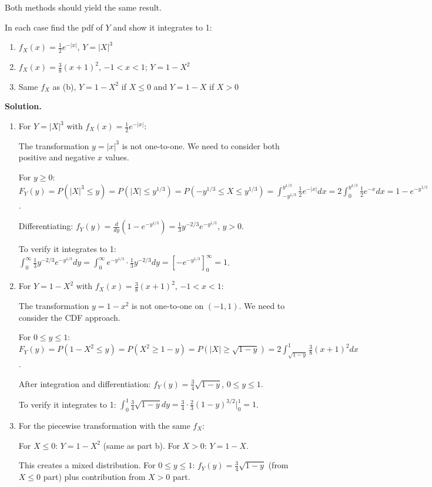 Both methods should yield the same result.

\begin{problembox}
In each case find the pdf of $Y$ and show it integrates to 1:
\begin{enumerate}[label=(\alph*)]
    \item $f_X(x) = \frac{1}{2}e^{-|x|}$, $Y=|X|^3$
    \item $f_X(x) = \frac{3}{8}(x+1)^2$, $-1<x<1$; $Y=1-X^2$
    \item Same $f_X$ as (b), $Y=1-X^2$ if $X\leq0$ and $Y=1-X$ if $X>0$
\end{enumerate}
\end{problembox}

\noindent\textbf{Solution.}
\begin{enumerate}[label=(\alph*)]
    \item For $Y = |X|^3$ with $f_X(x) = \frac{1}{2}e^{-|x|}$:
    
    The transformation $y = |x|^3$ is not one-to-one. We need to consider both positive and negative $x$ values.
    
    For $y \geq 0$: $F_Y(y) = P(|X|^3 \leq y) = P(|X| \leq y^{1/3}) = P(-y^{1/3} \leq X \leq y^{1/3}) = \int_{-y^{1/3}}^{y^{1/3}} \frac{1}{2}e^{-|x|}dx = 2\int_0^{y^{1/3}} \frac{1}{2}e^{-x}dx = 1 - e^{-y^{1/3}}$.
    
    Differentiating: $f_Y(y) = \frac{d}{dy}(1 - e^{-y^{1/3}}) = \frac{1}{3}y^{-2/3}e^{-y^{1/3}}$, $y > 0$.
    
    To verify it integrates to 1: $\int_0^\infty \frac{1}{3}y^{-2/3}e^{-y^{1/3}}dy = \int_0^\infty e^{-y^{1/3}} \cdot \frac{1}{3}y^{-2/3}dy = \left[-e^{-y^{1/3}}\right]_0^\infty = 1$.
    
    \item For $Y = 1-X^2$ with $f_X(x) = \frac{3}{8}(x+1)^2$, $-1 < x < 1$:
    
    The transformation $y = 1-x^2$ is not one-to-one on $(-1,1)$. We need to consider the CDF approach.
    
    For $0 \leq y \leq 1$: $F_Y(y) = P(1-X^2 \leq y) = P(X^2 \geq 1-y) = P(|X| \geq \sqrt{1-y}) = 2\int_{\sqrt{1-y}}^1 \frac{3}{8}(x+1)^2dx$.
    
    After integration and differentiation: $f_Y(y) = \frac{3}{4}\sqrt{1-y}$, $0 \leq y \leq 1$.
    
    To verify it integrates to 1: $\int_0^1 \frac{3}{4}\sqrt{1-y}dy = \frac{3}{4} \cdot \frac{2}{3}(1-y)^{3/2}|_0^1 = 1$.
    
    \item For the piecewise transformation with the same $f_X$:
    
    For $X \leq 0$: $Y = 1-X^2$ (same as part b).
    For $X > 0$: $Y = 1-X$.
    
    This creates a mixed distribution. For $0 \leq y \leq 1$: $f_Y(y) = \frac{3}{4}\sqrt{1-y}$ (from $X \leq 0$ part) plus contribution from $X > 0$ part.
\end{enumerate}

